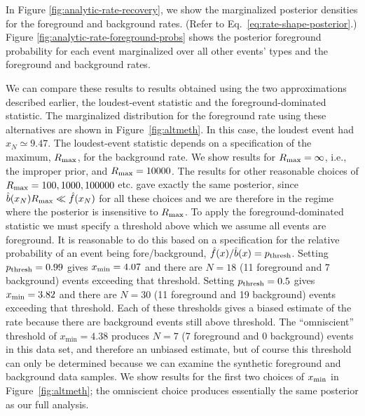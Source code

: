 \documentclass[aps,prd,reprint,nofootinbib]{revtex4-1}
\begin{document}
In Figure \ref{fig:analytic-rate-recovery}, we show the marginalized
posterior densities for the foreground and background rates.  (Refer
to Eq.~\eqref{eq:rate-shape-posterior}.)  Figure
\ref{fig:analytic-rate-foreground-probs} shows the posterior
foreground probability for each event marginalized over all other
events' types and the foreground and background rates.

We can compare these results to results obtained using the two
approximations described earlier, the loudest-event statistic and the
foreground-dominated statistic. The marginalized distribution for the
foreground rate using these alternatives are shown in
Figure~\ref{fig:altmeth}. In this case, the loudest event had
$x_N\simeq 9.47$. The loudest-event statistic depends on a
specification of the maximum, $R_{\rm max}$, for the background
rate. We show results for $R_{\rm max}=\infty$, i.e., the improper
prior, and $R_{\rm max}=10000$. The results for other reasonable
choices of $R_{\rm max} = 100, 1000, 100000$ etc. gave exactly the
same posterior, since $\hat{b}(x_N) R_{\rm max} \ll \hat{f}(x_N)$ for
all these choices and we are therefore in the regime where the
posterior is insensitive to $R_{\rm max}$. To apply the
foreground-dominated statistic we must specify a threshold above which
we assume all events are foreground. It is reasonable to do this based
on a specification for the relative probability of an event being
fore/background, $\hat{f}(x)/\hat{b}(x)=p_{\rm thresh}$. Setting
$p_{\rm thresh}=0.99$ gives $x_{\rm min}=4.07$ and there are $N=18$
(11 foreground and 7 background) events exceeding that
threshold. Setting $p_{\rm thresh}=0.5$ gives $x_{\rm min}=3.82$ and
there are $N=30$ (11 foreground and 19 background) events exceeding
that threshold.  Each of these thresholds gives a biased estimate of
the rate because there are background events still above threshold.
The ``omniscient'' threshold of $x_\mathrm{min} = 4.38$ produces $N=7$
(7 foreground and 0 background) events in this data set, and therefore
an unbiased estimate, but of course this threshold can only be
determined because we can examine the synthetic foreground and
background data samples.  We show results for the first two choices of
$x_{\rm min}$ in Figure~\ref{fig:altmeth}; the omniscient choice
produces essentially the same posterior as our full analysis.
\end{document}
